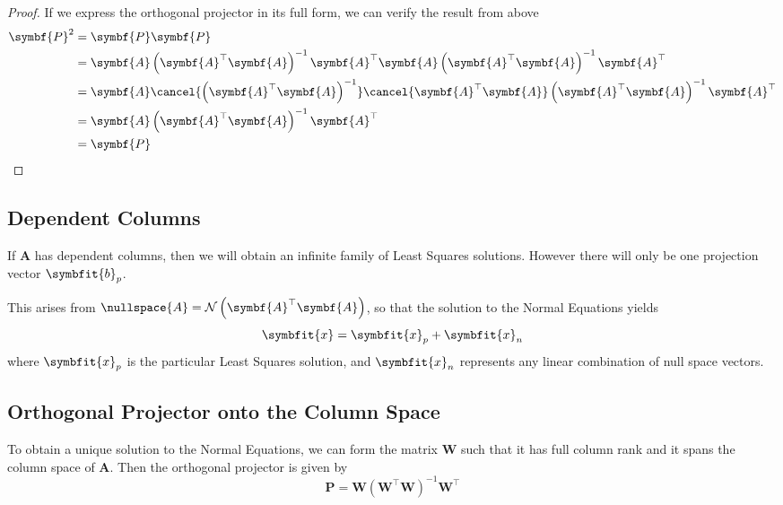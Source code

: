 \documentclass{article}
\begin{document}
\begin{proof}
    If we express the orthogonal projector in its full form, we can verify the result from above
    \begin{align*}
        \symbf{P}^2 & = \symbf{P} \symbf{P}                                                                                                                                           \\
                    & = \symbf{A} \left( \symbf{A}^\top \symbf{A} \right)^{-1} \symbf{A}^\top \symbf{A} \left( \symbf{A}^\top \symbf{A} \right)^{-1} \symbf{A}^\top                   \\
                    & = \symbf{A} \cancel{\left( \symbf{A}^\top \symbf{A} \right)^{-1}} \cancel{\symbf{A}^\top \symbf{A}} \left( \symbf{A}^\top \symbf{A} \right)^{-1} \symbf{A}^\top \\
                    & = \symbf{A} \left( \symbf{A}^\top \symbf{A} \right)^{-1} \symbf{A}^\top                                                                                         \\
                    & = \symbf{P}
    \end{align*}
\end{proof}
\subsection{Dependent Columns}
If \(\symbf{A}\) has dependent columns, then we will obtain an infinite family of Least
Squares solutions. However there will only be one projection vector \(\symbfit{b}_p\).

This arises from \(\nullspace{A} = \mathcal{N}\left(\symbf{A}^\top \symbf{A}\right)\), so that
the solution to the Normal Equations yields
\begin{equation*}
    \symbfit{x} = \symbfit{x}_p + \symbfit{x}_n
\end{equation*}
where \(\symbfit{x}_p\) is the particular Least Squares solution, and \(\symbfit{x}_n\) represents
any linear combination of null space vectors.
\subsection{Orthogonal Projector onto the Column Space}
To obtain a unique solution to the Normal Equations, we can form the matrix \(\symbf{W}\)
such that it has full column rank and it spans the column space of \(\symbf{A}\).
Then the orthogonal projector is given by
\begin{equation*}
    \symbf{P} = \symbf{W} \left( \symbf{W}^\top \symbf{W} \right)^{-1} \symbf{W}^\top
\end{equation*}
\end{document}
